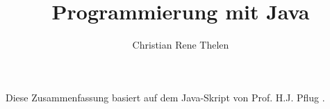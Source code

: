 \documentclass[german]{spicker}
\title{Programmierung mit Java}
\author{Christian Rene Thelen}
\begin{document}
\maketitle
Diese Zusammenfassung basiert auf dem Java-Skript von Prof. H.J. Pflug \cite{pflug2022}.
\tableofcontents
\newpage



% 
% 
% 
% 

\printindex
\printindex[Beispiele]

\printbibliography
\end{document}
